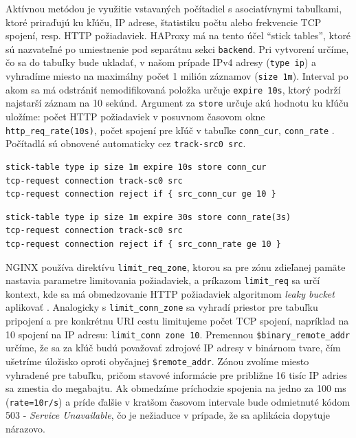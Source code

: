 \documentclass[12pt, a4paper]{article}
\begin{document}
Aktívnou metódou je využitie vstavaných počítadiel s asociatívnymi tabuľkami, ktoré priraďujú ku kľúču,
IP adrese, štatistiku počtu alebo frekvencie TCP spojení, resp. HTTP požiadaviek. HAProxy má na tento
účel \enquote{stick tables}, ktoré sú nazvateľné po umiestnenie pod separátnu sekci \verb|backend|. Pri
vytvorení určíme, čo sa do tabuľky bude ukladať, v našom prípade IPv4 adresy (\verb|type ip|) a vyhradíme miesto na maximálny počet 1 milión záznamov (\verb|size 1m|). Interval po akom sa má odstrániť 
nemodifikovaná položka určuje \verb|expire 10s|, ktorý podrží najstarší záznam na 10 sekúnd. Argument za
\verb|store| určuje akú hodnotu ku kľúču uložíme: počet HTTP požiadaviek v posuvnom časovom okne 
\verb|http_req_rate(10s)|, počet spojení pre kľúč v tabuľke \verb|conn_cur|, \verb|conn_rate| 
\cite{haproxy-stick-tables}. Počítadlá sú obnovené automaticky cez \verb|track-src0 src|.

\begin{lstlisting}[caption=HAProxy: obmedzenie počtu otvorených spojení na IP adresu na 10 zároveň]
stick-table type ip size 1m expire 10s store conn_cur
tcp-request connection track-sc0 src
tcp-request connection reject if { src_conn_cur ge 10 }
\end{lstlisting}

\begin{lstlisting}[caption=HAProxy: obmedzenie frekvencie pripojení na používateľa]
stick-table type ip size 1m expire 30s store conn_rate(3s)
tcp-request connection track-sc0 src
tcp-request connection reject if { src_conn_rate ge 10 }
\end{lstlisting}

NGINX používa direktívu \verb|limit_req_zone|, ktorou sa pre zónu zdieľanej pamäte nastavia parametre
limitovania požiadaviek, a príkazom \verb|limit_req| sa určí kontext, kde sa má obmedzovanie HTTP požiadaviek 
algoritmom \emph{leaky bucket} aplikovať \cite{nginx-rate-limiting}. Analogicky s \verb|limit_conn_zone| sa 
vyhradí priestor pre tabuľku pripojení a pre konkrétnu URI cestu limitujeme počet TCP spojení, napríklad na 
10 spojení na IP adresu: \verb|limit_conn zone 10|. Premennou \verb|$binary_remote_addr| určíme, že sa za 
kľúč budú považovať zdrojové IP adresy v binárnom tvare, čím ušetríme úložisko oproti obyčajnej
\verb|$remote_addr|. Zónou zvolíme miesto vyhradené pre tabuľku, pričom stavové informácie pre približne 16 
tisíc IP adries sa zmestia do megabajtu. Ak obmedzíme príchodzie spojenia na jedno za 100 ms 
(\verb|rate=10r/s|) a príde ďalšie v kratšom časovom intervale bude odmietnuté kódom 503 - 
\emph{Service Unavailable}, čo je nežiaduce v prípade, že sa aplikácia dopytuje nárazovo. 
\end{document}

